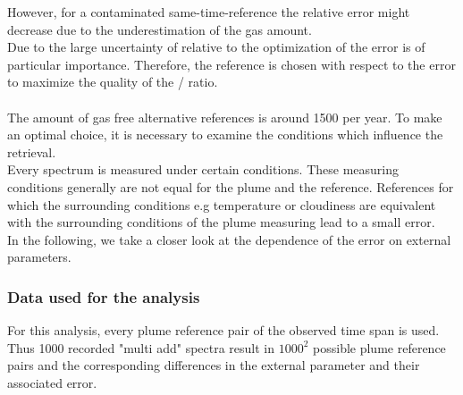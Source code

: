 However, for a contaminated same-time-reference the relative error might decrease due to the underestimation of the gas amount. \\
Due to the large uncertainty of  relative to  the optimization of the  error is of particular importance. Therefore, the reference is chosen with respect to the  error to maximize the quality of the / ratio. \\
\\
The amount of gas free alternative references is around 1500 per year. To make an optimal choice, it is necessary to examine the conditions which influence the  retrieval.\\
Every spectrum is measured under certain conditions. These measuring conditions generally are not equal for the plume and the reference. References for which the surrounding conditions e.g temperature or cloudiness are equivalent with the surrounding conditions of the  plume measuring lead to a small error.\\
In the following, we take a closer look at the dependence of the  error on external parameters. 
%
\subsubsection*{Data used for the analysis}
For this analysis, every plume reference pair of the observed time span is used. Thus 1000 recorded "multi add" spectra result in $1000^2$ possible plume reference pairs and the corresponding differences in the external parameter and their associated  error.


